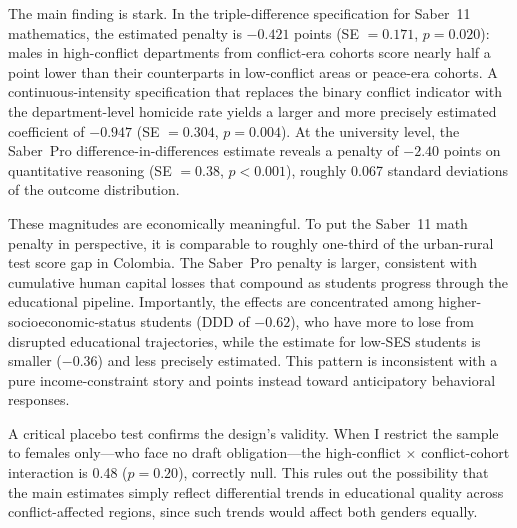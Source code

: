 \documentclass[12pt]{article}
\begin{document}
The main finding is stark. In the triple-difference specification for Saber~11 mathematics, the estimated penalty is $-0.421$ points (SE $= 0.171$, $p = 0.020$): males in high-conflict departments from conflict-era cohorts score nearly half a point lower than their counterparts in low-conflict areas or peace-era cohorts. A continuous-intensity specification that replaces the binary conflict indicator with the department-level homicide rate yields a larger and more precisely estimated coefficient of $-0.947$ (SE $= 0.304$, $p = 0.004$). At the university level, the Saber~Pro difference-in-differences estimate reveals a penalty of $-2.40$ points on quantitative reasoning (SE $= 0.38$, $p < 0.001$), roughly 0.067 standard deviations of the outcome distribution.

These magnitudes are economically meaningful. To put the Saber~11 math penalty in perspective, it is comparable to roughly one-third of the urban-rural test score gap in Colombia. The Saber~Pro penalty is larger, consistent with cumulative human capital losses that compound as students progress through the educational pipeline. Importantly, the effects are concentrated among higher-socioeconomic-status students (DDD of $-0.62$), who have more to lose from disrupted educational trajectories, while the estimate for low-SES students is smaller ($-0.36$) and less precisely estimated. This pattern is inconsistent with a pure income-constraint story and points instead toward anticipatory behavioral responses.

A critical placebo test confirms the design's validity. When I restrict the sample to females only---who face no draft obligation---the high-conflict $\times$ conflict-cohort interaction is 0.48 ($p = 0.20$), correctly null. This rules out the possibility that the main estimates simply reflect differential trends in educational quality across conflict-affected regions, since such trends would affect both genders equally.
\end{document}
